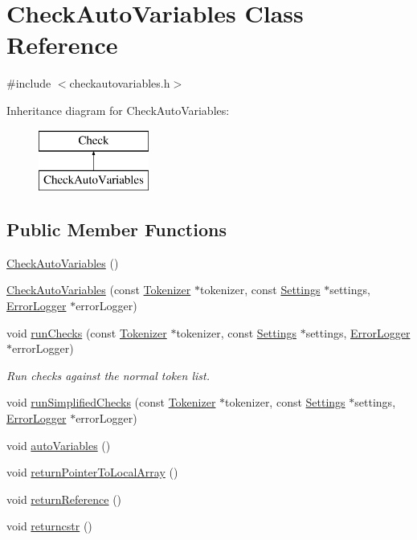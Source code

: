 \hypertarget{class_check_auto_variables}{\section{Check\-Auto\-Variables Class Reference}
\label{class_check_auto_variables}
}


{\ttfamily \#include $<$checkautovariables.\-h$>$}

Inheritance diagram for Check\-Auto\-Variables\-:\begin{figure}[H]
\begin{center}
\leavevmode
\includegraphics[height=2.000000cm]{class_check_auto_variables}
\end{center}
\end{figure}
\subsection*{Public Member Functions}
\begin{DoxyCompactItemize}
\item 
\hyperlink{class_check_auto_variables_ac25d0eaa94d3d337dd636f6aaae9a934}{Check\-Auto\-Variables} ()
\item 
\hyperlink{class_check_auto_variables_abfc45c06de7f9478de4dbe9d82c08a30}{Check\-Auto\-Variables} (const \hyperlink{class_tokenizer}{Tokenizer} $\ast$tokenizer, const \hyperlink{class_settings}{Settings} $\ast$settings, \hyperlink{class_error_logger}{Error\-Logger} $\ast$error\-Logger)
\item 
void \hyperlink{class_check_auto_variables_a667c0b75e6b3304da5f0970f4f283e6d}{run\-Checks} (const \hyperlink{class_tokenizer}{Tokenizer} $\ast$tokenizer, const \hyperlink{class_settings}{Settings} $\ast$settings, \hyperlink{class_error_logger}{Error\-Logger} $\ast$error\-Logger)
\begin{DoxyCompactList}\small\item\em Run checks against the normal token list. \end{DoxyCompactList}\item 
void \hyperlink{class_check_auto_variables_a68a13cebf21059199ad4c9008ecc37a7}{run\-Simplified\-Checks} (const \hyperlink{class_tokenizer}{Tokenizer} $\ast$tokenizer, const \hyperlink{class_settings}{Settings} $\ast$settings, \hyperlink{class_error_logger}{Error\-Logger} $\ast$error\-Logger)
\item 
void \hyperlink{class_check_auto_variables_acca7636cc1768e6a17fc0f199fbb7497}{auto\-Variables} ()
\item 
void \hyperlink{class_check_auto_variables_a19e49f355a1e1a4ea0d0d88028d9964d}{return\-Pointer\-To\-Local\-Array} ()
\item 
void \hyperlink{class_check_auto_variables_a06e329bf2f8e2fe37acfdb4d4412f642}{return\-Reference} ()
\item 
void \hyperlink{class_check_auto_variables_adcbd51b2bc5f68faaa65d2f56c2e1564}{returncstr} ()
\end{DoxyCompactItemize}
